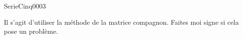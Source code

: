 
\begin{corrige}{SerieCinq0003}

	Il s'agit d'utiliser la méthode de la matrice compagnon. Faites moi signe si cela pose un problème.

\end{corrige}
